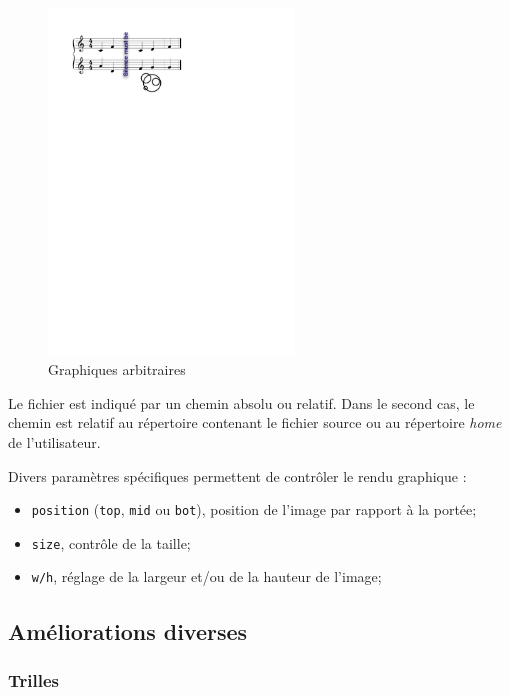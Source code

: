 \documentclass{article}
\newcommand{\code}[1]		{{\small \texttt{#1}}}
\begin{document}
\begin{figure}[h]
\centering
\includegraphics[width=65mm]{img/partitions/symbol.pdf}
\caption{Graphiques arbitraires}
\label{fig:symbol}
\end{figure}

Le fichier est indiqué par un chemin absolu ou relatif. Dans le second cas, le chemin est relatif au répertoire contenant le fichier source ou au répertoire \emph{home} de l'utilisateur.

Divers paramètres spécifiques permettent de contrôler le rendu graphique :
\begin{itemize}
	\item \code{position} (\code{top}, \code{mid} ou \code{bot}), position de l'image par rapport à la portée;
	\item \code{size}, contrôle de la taille;
	\item \code{w/h}, réglage de la largeur et/ou de la hauteur de l'image;
\end{itemize}

\subsection{Améliorations diverses}\label{subsec:amelioraions}


\subsubsection{Trilles}\label{subsubsec:trilles}

\end{document}
